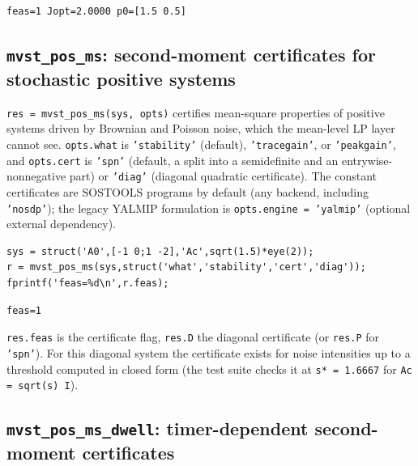 \documentclass[11pt,oneside]{report}
\newcommand{\code}[1]{\texttt{#1}}
\begin{document}
\begin{lstlisting}[style=outputstyle]
feas=1 Jopt=2.0000 p0=[1.5 0.5]
\end{lstlisting}

\hypertarget{mvst_pos_ms-second-moment-certificates-for-stochastic-positive-systems}{%
\subsection{\texorpdfstring{\code{mvst\_pos\_ms}: second-moment certificates for stochastic positive systems}{mvst\_pos\_ms: second-moment certificates for stochastic positive systems}}\label{mvst_pos_ms-second-moment-certificates-for-stochastic-positive-systems}}

\code{res = mvst\_pos\_ms(sys, opts)} certifies mean-square properties of positive
systems driven by Brownian and Poisson noise, which the mean-level LP layer
cannot see. \code{opts.what} is \code{'stability'} (default), \code{'tracegain'}, or
\code{'peakgain'}, and \code{opts.cert} is \code{'spn'} (default, a split into a
semidefinite and an entrywise-nonnegative part) or \code{'diag'} (diagonal quadratic
certificate). The constant certificates are SOSTOOLS programs by default (any backend,
including \code{'nosdp'}); the legacy YALMIP formulation is \code{opts.engine = 'yalmip'}
(optional external dependency).

\begin{lstlisting}[style=matlabstyle]
sys = struct('A0',[-1 0;1 -2],'Ac',sqrt(1.5)*eye(2));
r = mvst_pos_ms(sys,struct('what','stability','cert','diag'));
fprintf('feas=%d\n',r.feas);
\end{lstlisting}

\begin{lstlisting}[style=outputstyle]
feas=1
\end{lstlisting}

\code{res.feas} is the certificate flag, \code{res.D} the diagonal certificate (or \code{res.P}
for \code{'spn'}). For this diagonal system the certificate exists for noise
intensities up to a threshold computed in closed form (the test suite checks it
at \code{s* = 1.6667} for \code{Ac = sqrt(s) I}).

\hypertarget{mvst_pos_ms_dwell-timer-dependent-second-moment-certificates}{%
\subsection{\texorpdfstring{\code{mvst\_pos\_ms\_dwell}: timer-dependent second-moment certificates}{mvst\_pos\_ms\_dwell: timer-dependent second-moment certificates}}\label{mvst_pos_ms_dwell-timer-dependent-second-moment-certificates}}
\end{document}
